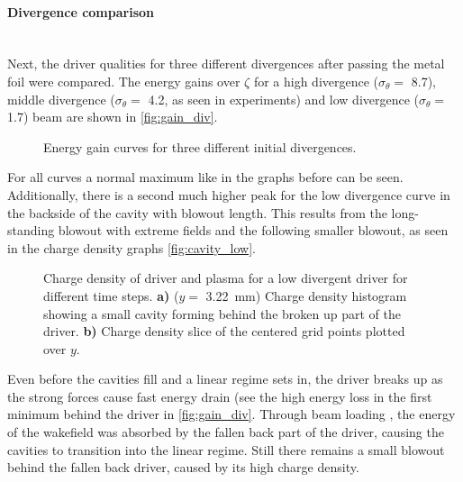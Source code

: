 \documentclass[bachelor_thesis]{subfiles}
\begin{document}
\paragraph*{Divergence comparison}\label{para:div_comp}\hspace{0pt} \\
Next, the driver qualities for three different divergences after passing the metal foil were compared. The energy gains over $\zeta$ for a high divergence ($\sigma_{\theta}=$ \qty{8.7}{\mrad}), middle divergence ($\sigma_{\theta}=$ \qty{4.2}{\mrad}, as seen in experiments) 
and low divergence ($\sigma_{\theta}=$ \qty{1.7}{\mrad}) beam are shown in \autoref{fig:gain_div}.
\begin{figure}
	\centering
	
	\caption{Energy gain curves for three different initial divergences.}
	\label{fig:gain_div}
\end{figure}
For all curves a normal maximum like in the graphs before can be seen. Additionally, there is a second much higher peak for the low divergence curve in the backside of the cavity with blowout length.
This results from the long-standing blowout with extreme fields and the following smaller blowout, as seen in the charge density graphs \autoref{fig:cavity_low}.

\begin{figure}
	\centering
	
	\caption{Charge density of driver and plasma for a low divergent driver for different time steps.
	\textbf{a)} ($y=$ \qty{3.22}{mm}) Charge density histogram showing a small cavity forming behind the broken up part of the driver.
	\textbf{b)} Charge density slice of the centered grid points plotted over $y$. 
	}
	\label{fig:cavity_low}
\end{figure}
Even before the cavities fill and a linear regime sets in, the driver breaks up as the strong forces cause fast energy drain (see the high energy loss in the first minimum behind the driver in \autoref{fig:gain_div}.
Through beam loading \cite{Kirchen2021, Goetzfried2020}, the energy of the wakefield was absorbed by the fallen back part of the driver, causing the cavities to transition into the linear regime. 
Still there remains a small blowout behind the  fallen back driver, caused by its high charge density.
\end{document}
